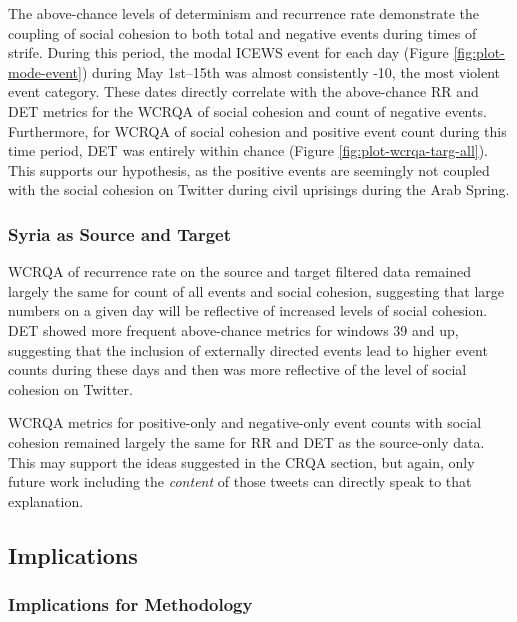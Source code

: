 \documentclass[english,man]{apa6}
\begin{document}
The above-chance levels of determinism and recurrence rate demonstrate
the coupling of social cohesion to both total and negative events during
times of strife. During this period,
the modal ICEWS event for each day (Figure \ref{fig:plot-mode-event})
during May 1st--15th was almost consistently -10, the most violent
event category. These dates directly correlate with the above-chance RR and DET
metrics for the WCRQA of social cohesion and count of negative events.
Furthermore, for WCRQA of social cohesion and positive event count during
this time period, DET was entirely within chance (Figure
\ref{fig:plot-wcrqa-targ-all}). This supports our hypothesis, as the
positive events are seemingly not coupled with the social cohesion on Twitter
during civil uprisings during the Arab Spring.

\hypertarget{syria-as-source-and-target-3}{%
\subsubsection{Syria as Source and Target}\label{syria-as-source-and-target-3}}

WCRQA of recurrence rate on the source and target filtered data remained
largely the same for count of all events and social cohesion, suggesting
that large numbers on a given day will be reflective of increased levels
of social cohesion. DET showed more frequent above-chance metrics
for windows 39 and up, suggesting that the inclusion of externally
directed events lead to higher event counts during these days and then
was more reflective of the level of social cohesion on Twitter.

WCRQA metrics for positive-only and negative-only event counts with
social cohesion remained largely the same for
RR and DET as the source-only data. This may support the ideas suggested
in the CRQA section, but again, only future work including the \emph{content}
of those tweets can directly speak to that explanation.

\hypertarget{implications}{%
\subsection{Implications}\label{implications}}

\hypertarget{implications-for-methodology}{%
\subsubsection{Implications for Methodology}\label{implications-for-methodology}}
\end{document}
